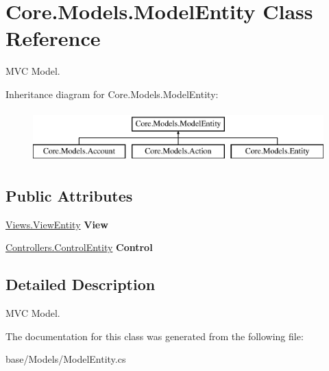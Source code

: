 \hypertarget{classCore_1_1Models_1_1ModelEntity}{\section{Core.\-Models.\-Model\-Entity Class Reference}
\label{classCore_1_1Models_1_1ModelEntity}
}


M\-V\-C Model.  


Inheritance diagram for Core.\-Models.\-Model\-Entity\-:\begin{figure}[H]
\begin{center}
\leavevmode
\includegraphics[height=2.000000cm]{classCore_1_1Models_1_1ModelEntity}
\end{center}
\end{figure}
\subsection*{Public Attributes}
\begin{DoxyCompactItemize}
\item 
\hypertarget{classCore_1_1Models_1_1ModelEntity_a19619acbb856f7b54c971b38f061509c}{\hyperlink{classCore_1_1Views_1_1ViewEntity}{Views.\-View\-Entity} {\bfseries View}}\label{classCore_1_1Models_1_1ModelEntity_a19619acbb856f7b54c971b38f061509c}

\item 
\hypertarget{classCore_1_1Models_1_1ModelEntity_a78a6ddcf09a0b517230e738c40faa813}{\hyperlink{classCore_1_1Controllers_1_1ControlEntity}{Controllers.\-Control\-Entity} {\bfseries Control}}\label{classCore_1_1Models_1_1ModelEntity_a78a6ddcf09a0b517230e738c40faa813}

\end{DoxyCompactItemize}


\subsection{Detailed Description}
M\-V\-C Model. 



The documentation for this class was generated from the following file\-:\begin{DoxyCompactItemize}
\item 
base/\-Models/Model\-Entity.\-cs\end{DoxyCompactItemize}
